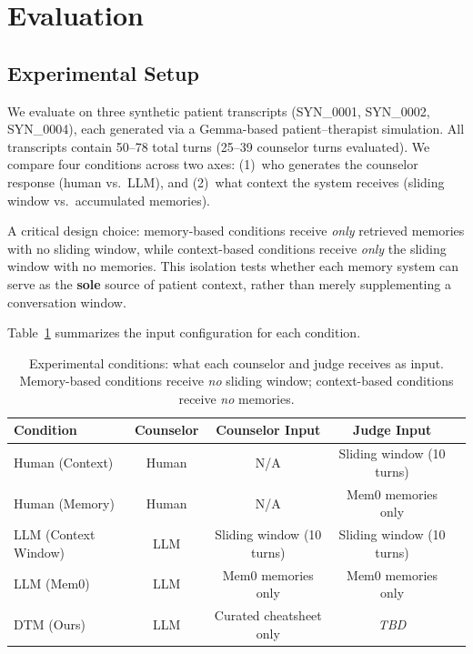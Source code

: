 \section{Evaluation}

\subsection{Experimental Setup}

We evaluate on three synthetic patient transcripts (SYN\_0001, SYN\_0002, SYN\_0004), each generated via a Gemma-based patient--therapist simulation. All transcripts contain 50--78 total turns (25--39 counselor turns evaluated). We compare four conditions across two axes: (1)~who generates the counselor response (human vs.\ LLM), and (2)~what context the system receives (sliding window vs.\ accumulated memories).

A critical design choice: memory-based conditions receive \emph{only} retrieved memories with no sliding window, while context-based conditions receive \emph{only} the sliding window with no memories. This isolation tests whether each memory system can serve as the \textbf{sole} source of patient context, rather than merely supplementing a conversation window.

Table~\ref{tab:config} summarizes the input configuration for each condition.

\begin{table}[h]
\centering
\caption{Experimental conditions: what each counselor and judge receives as input. Memory-based conditions receive \emph{no} sliding window; context-based conditions receive \emph{no} memories.}
\label{tab:config}
\small
\begin{tabular}{lcccc}
\toprule
\textbf{Condition} & \textbf{Counselor} & \textbf{Counselor Input} & \textbf{Judge Input} \\
\midrule
Human (Context) & Human & N/A & Sliding window (10 turns) \\
Human (Memory) & Human & N/A & Mem0 memories only \\
LLM (Context Window) & LLM & Sliding window (10 turns) & Sliding window (10 turns) \\
LLM (Mem0) & LLM & Mem0 memories only & Mem0 memories only \\
DTM (Ours) & LLM & Curated cheatsheet only & \textit{TBD} \\
\bottomrule
\end{tabular}
\end{table}

